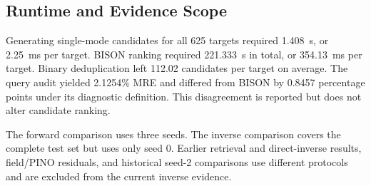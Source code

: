 \subsection{Runtime and Evidence Scope}

Generating single-mode candidates for all 625 targets required 1.408~s, or
2.25~ms per target. BISON ranking required 221.333~s in total, or 354.13~ms per
target. Binary deduplication left 112.02 candidates per target on average. The
query audit yielded 2.1254\% MRE and differed from BISON by
0.8457 percentage points under its diagnostic definition. This disagreement
is reported but does not alter candidate ranking.

The forward comparison uses three seeds. The inverse comparison covers the
complete test set but uses only seed 0. Earlier retrieval and direct-inverse
results, field/PINO residuals, and historical seed-2 comparisons use different
protocols and are excluded from the current inverse evidence.

